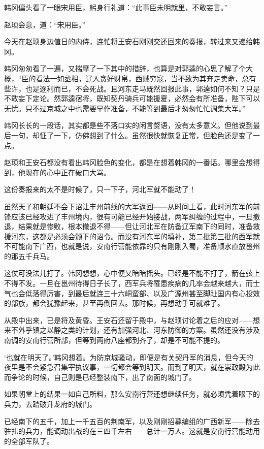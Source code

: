 韩冈偏头看了一眼宋用臣，躬身行礼道：“此事臣未明就里，不敢妄言。”

赵顼会意，道：“宋用臣。”

今天在赵顼身边值日的内侍，连忙将王安石刚刚交还回来的奏报，转过来又递给韩冈。

韩冈匆匆看了一遍，又揣摩了一下其中的措辞，也算是对郭逵的心思了解了个大概，“臣的看法一如丞相，辽人贪好财帛，西贼穷寇，当不致为其奔走卖命，总有些许，也是逐利而已，不会死战。且河东走马既然回报此事，郭逵如何不知？只是不敢妄下定论。然郭逵宿将，既知契丹骑兵可能援夏，必然会有所准备，陛下可以无忧。只不过京城之中也需要早作准备，不能等到最后才匆匆忙忙调集大军。”

韩冈长长的一段话，其实都是些不落口实的闲言赘语，没有太多意义。但他说到最后一句，却怔了一下，仿佛想到了什么。虽然很快就恢复正常，但脸色还是变了一点。

赵顼和王安石都没有看出韩冈脸色的变化，都是在想着韩冈的一番话。哪里会想得到，他现在的心中正在破口大骂。

这份奏报来的太不是时候了，只一下子，河北军就不能动了！

虽然天子和朝廷不会下诏让丰州前线的大军返回——从时间上看，此时河东军的前锋应该已经攻进了丰州境内，很有可能已经开始接战，两军纠缠的过程中，一旦撤退，结果就是惨败，根本撤退不得——但让河北军在防备辽军南下的同时，准备救援河东，这都是必须会颁下的诏令。而没有河东军的填补，第二批第三批的西军就不可能南下广西，也就是说，安南行营能依靠的只有刚刚入蜀，准备顺水直放邕州的那五千兵马。

这仗可没法儿打了。韩冈想想，心中便又暗暗摇头。已经是不能不打了，箭在弦上不得不发。一旦在邕州待得日子长了，西军兵将罹患疾病的几率会越来越大，而士气也会低落得厉害，到最后就连三十六峒蛮部、以及广源州甚至脚趾国内有心投效的部族，都会犹豫起来，甚至再倒回去。那时候，再想动手可就难了。

从殿中出来，已是将及黄昏。王安石还留于殿中，与赵顼讨论着之后的应对——想来不外乎镇之以静之类的计划，还有加强河北、河东防御的方案。虽然还没有涉及南调的安南行营所部，但等到两府八座都到齐了，却是不可能不提的。

‘也就在明天了。’韩冈想着。为防京城骚动，即便是有关契丹军的消息，但今天的夜里是不会紧急召集宰执议事，一切都会等到明天。而到了明天，就在崇政殿为此而争论的时候，自己则是已经整装南下，出了南面的城门了。

如果朝堂上的结果一如自己所料，那么安南行营还想继续任务，就必须凭着眼下的兵力，去踏破升龙府的城门。

已经南下的五千，加上一千五百的荆南军，以及刚刚招募编组的广西新军——除去驻扎的兵力，能调动出战的在三四千左右——总计一万人。这就是安南行营能动用的全部军队了。

